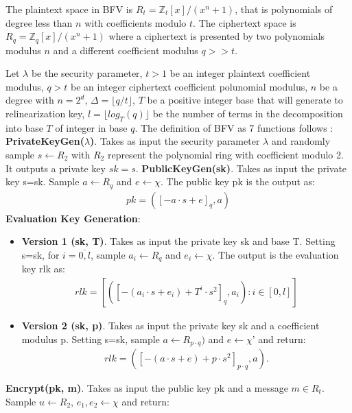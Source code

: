 \documentclass[A4paper,12pt]{article}
\begin{document}
The plaintext space in BFV is $R_t = \mathbb{Z}_t[x]/(x^n + 1)$, that is polynomials of degree less than $n$ with coefficients modulo $t$. The ciphertext space is $R_q = \mathbb{Z}_q[x]/(x^n + 1)$ where a ciphertext is presented by two polynomials modulus $n$ and a different coefficient modulus $q >> t$.

Let $\lambda$ be the security parameter, $t > 1$ be an integer plaintext coefficient modulus, $q > t$ be an integer ciphertext coefficient polunomial modulus, $n$ be a degree with $n = 2^d$, $\Delta = \lfloor q/t \rfloor$, $T$ be a positive integer base that will generate to relinearization key, $l= \lfloor log_T(q) \rfloor$ be the number of terms in the decomposition into base $T$ of integer in base $q$. The definition of BFV as 7 functions follows \cite{SHE}: \newline
\textbf{PrivateKeyGen($\lambda$)}. Takes as input the security parameter $\lambda$ and randomly sample $s \leftarrow R_2$ with $R_2$ represent the polynomial ring with coefficient modulo 2. It outputs a private key $sk=s$. \newline	
\textbf{PublicKeyGen(sk)}. Takes as input the private key s=sk. Sample $a \leftarrow R_q$ and $e \leftarrow \chi$. The public key pk is the output as:
	\begin{align*}
	pk = ([-a\cdot s + e]_q, a)
	\end{align*}	
\textbf{Evaluation Key Generation}:
	\begin{itemize}
		\item \textbf{Version 1 (sk, T)}. Takes as input the private key sk and base T. Setting s=sk, for $i = \overline{0, l}  $, sample $a_i \leftarrow R_q$ and $e_i \leftarrow \chi$. The output is the evaluation key rlk as:
		\begin{align*}
		rlk = [([-(a_i \cdot s + e_i) + T^i \cdot s^2]_q , a_i) : i \in [0,l]]
		\end{align*}
		
		\item \textbf{Version 2 (sk, p)}. Takes as input the private key sk and a coefficient modulus p. Setting s=sk, sample $a \leftarrow R_{p \cdot q})$ and $e \leftarrow \chi$'  and return:
		\begin{align*}
		rlk = ([-(a \cdot s + e) + p \cdot s^2]_{p \cdot q}, a).
		\end{align*}
		
	\end{itemize}	
\textbf{Encrypt(pk, m)}. Takes as input the public key pk and a message $m \in R_t$. Sample $u \leftarrow R_2$, $e_1, e_2 \leftarrow \chi$ and return:
\end{document}
